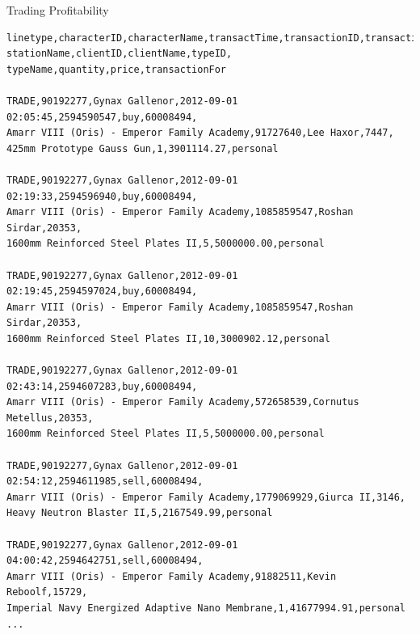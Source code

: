 \documentclass[12pt]{beamer}
\begin{document}
\begin{frame}[fragile]{Trading Profitability}

\begin{verbatim}
linetype,characterID,characterName,transactTime,transactionID,transactionType,stationID,
stationName,clientID,clientName,typeID,
typeName,quantity,price,transactionFor

TRADE,90192277,Gynax Gallenor,2012-09-01 02:05:45,2594590547,buy,60008494,
Amarr VIII (Oris) - Emperor Family Academy,91727640,Lee Haxor,7447,
425mm Prototype Gauss Gun,1,3901114.27,personal

TRADE,90192277,Gynax Gallenor,2012-09-01 02:19:33,2594596940,buy,60008494,
Amarr VIII (Oris) - Emperor Family Academy,1085859547,Roshan Sirdar,20353,
1600mm Reinforced Steel Plates II,5,5000000.00,personal

TRADE,90192277,Gynax Gallenor,2012-09-01 02:19:45,2594597024,buy,60008494,
Amarr VIII (Oris) - Emperor Family Academy,1085859547,Roshan Sirdar,20353,
1600mm Reinforced Steel Plates II,10,3000902.12,personal

TRADE,90192277,Gynax Gallenor,2012-09-01 02:43:14,2594607283,buy,60008494,
Amarr VIII (Oris) - Emperor Family Academy,572658539,Cornutus Metellus,20353,
1600mm Reinforced Steel Plates II,5,5000000.00,personal

TRADE,90192277,Gynax Gallenor,2012-09-01 02:54:12,2594611985,sell,60008494,
Amarr VIII (Oris) - Emperor Family Academy,1779069929,Giurca II,3146,
Heavy Neutron Blaster II,5,2167549.99,personal

TRADE,90192277,Gynax Gallenor,2012-09-01 04:00:42,2594642751,sell,60008494,
Amarr VIII (Oris) - Emperor Family Academy,91882511,Kevin Reboolf,15729,
Imperial Navy Energized Adaptive Nano Membrane,1,41677994.91,personal
...
\end{verbatim}

\end{frame}
\end{document}
